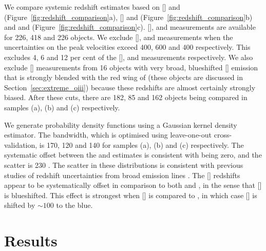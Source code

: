 We compare systemic redshift estimates based on [] and \hb (Figure~\ref{fig:redshift_comparison}a), [] and \ha (Figure~\ref{fig:redshift_comparison}b) and \hb and \ha (Figure~\ref{fig:redshift_comparison}c). 
[], \hb and \ha measurements are available for 226, 418 and 226 objects. 
We exclude [], \hb and \ha measurements when the uncertainties on the peak velocities exceed 400, 600 and 400 \kms respectively. 
This excludes 4, 6 and 12 per cent of the [], \hb and \ha measurements respectively. 
We also exclude [] measurements from 16 objects with very broad, blueshifted [] emission that is strongly blended with the red wing of \hb (these objects are discussed in Section~\ref{sec:extreme_oiii}) because these redshifts are almost certainly strongly biased.
After these cuts, there are 182, 85 and 162 objects being compared in samples (a), (b) and (c) respectively. 

We generate probability density functions using a Gaussian kernel density estimator.
The bandwidth, which is optimised using leave-one-out cross-validation, is 170, 120 and 140 \kms for samples (a), (b) and (c) respectively. 
The systematic offset between the \ha and \hb estimates is consistent with being zero, and the scatter is 230 \kms. 
The scatter in these distributions is consistent with previous studies of redshift uncertainties from broad emission lines \citep[e.g.][]{shen16b}. 
The [] redshifts appear to be systematically offset in comparison to both \ha and \hb, in the sense that [] is blueshifted. 
This effect is strongest when [] is compared to \hb, in which case [] is shifted by $\sim100$ \kms to the blue.

\section{Results}

